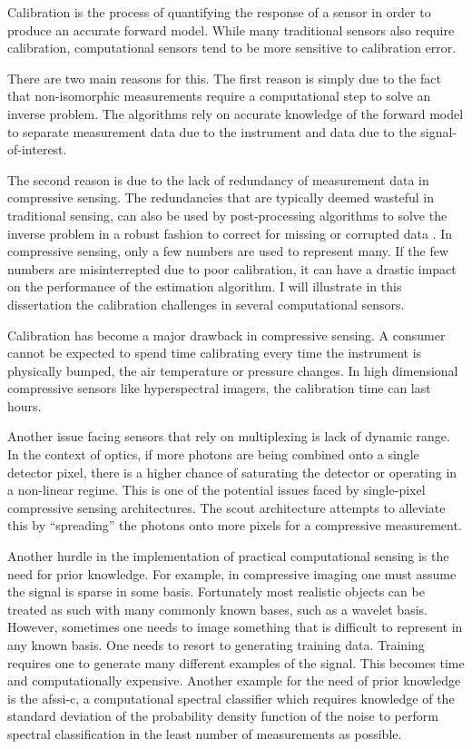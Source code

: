 Calibration is the process of quantifying the response of a sensor in order to produce an accurate forward model. While many traditional sensors also require calibration, computational sensors tend to be more sensitive to calibration error. 

There are two main reasons for this. The first reason is simply due to the fact that non-isomorphic measurements require a computational step to solve an inverse problem. The algorithms rely on accurate knowledge of the forward model to separate measurement data due to the instrument and data due to the signal-of-interest. 

The second reason is due to the lack of redundancy of measurement data in compressive sensing. The redundancies that are typically deemed wasteful in traditional sensing, can also be used by post-processing algorithms to solve the inverse problem in a robust fashion to correct for missing or corrupted data \cite{gehm2013calibration}. In \gls{compressive sensing}, only a few numbers are used to represent many. If the few numbers are misinterrepted due to poor calibration, it can have a drastic impact on the performance of the estimation algorithm. I will illustrate in this dissertation the calibration challenges in several computational sensors. 

Calibration has become a major drawback in compressive sensing. A consumer cannot be expected to spend time calibrating every time the instrument is physically bumped, the air temperature or pressure changes. In high dimensional compressive sensors like hyperspectral imagers, the calibration time can last hours.

Another issue facing sensors that rely on multiplexing is lack of dynamic range. In the context of optics, if more photons are being combined onto a single detector pixel, there is a higher chance of saturating the detector or operating in a non-linear regime. This is one of the potential issues faced by single-pixel compressive sensing architectures. The \gls{scout} architecture attempts to alleviate this by ``spreading'' the photons onto more pixels for a compressive measurement. 

Another hurdle in the implementation of practical computational sensing is the need for prior knowledge. For example, in compressive imaging one must assume the signal is sparse in some basis. Fortunately most realistic objects can be treated as such with many commonly known bases, such as a wavelet basis. However, sometimes one needs to image something that is difficult to represent in any known basis. One needs to resort to generating training data.  Training requires one to generate many different examples of the signal. This becomes time and computationally expensive. Another example for the need of prior knowledge is the \gls{afssi-c}, a computational spectral classifier which requires knowledge of the standard deviation of the probability density function of the noise to perform spectral classification in the least number of measurements as possible.

